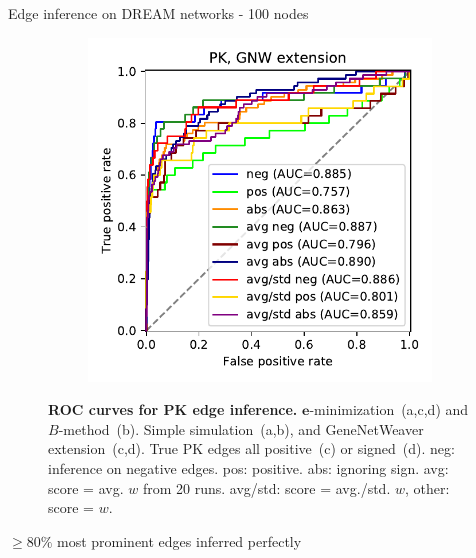 \begin{frame}{Edge inference on DREAM networks - 100 nodes}
\begin{figure}[ht]
\begin{subfigure}[b]{0.24\textwidth}
\end{subfigure}
\hfill
\begin{subfigure}[b]{0.24\textwidth}\centering\caption{}
\includegraphics[width=\textwidth]{analysis/fig/roc_pk_gnw.pdf}\label{fig:micro_average.d}
\end{subfigure}
\caption{\textbf{ROC curves for PK edge inference.} $\boldsymbol{e}$-minimization~(a,c,d) and $B$-method~(b). Simple simulation~(a,b), and GeneNetWeaver extension~(c,d). True PK edges all positive~(c) or signed~(d). neg: inference on negative edges. pos: positive. abs: ignoring sign. avg: score = avg. $w$ from 20 runs. avg/std: score = avg./std. $w$, other: score = $w$. }
\label{fig:micro_average}
\end{figure}
$\ge 80 \%$ most prominent edges inferred perfectly

\end{frame}
